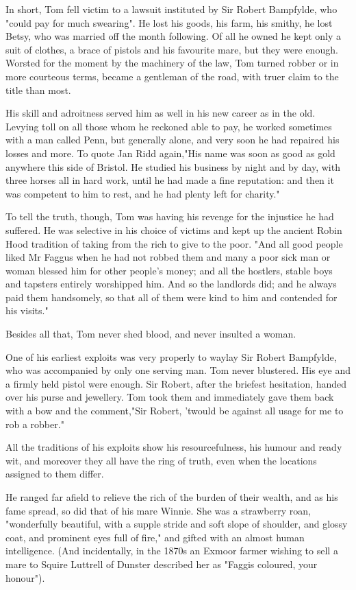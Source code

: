 In short, Tom fell victim to a lawsuit instituted by Sir Robert Bampfylde, who "could pay for much swearing". He lost his goods, his farm, his smithy, he lost Betsy, who was married off the month following. Of all he owned he kept only a suit of clothes, a brace of pistols and his favourite mare, but they were enough. Worsted for the moment by the machinery of the law, Tom turned robber   or in more courteous terms, became a gentleman of the road, with truer claim to the title than most.

His skill and adroitness served him as well in his new career as in the old. Levying toll on all those whom he reckoned able to pay, he worked sometimes with a man called Penn, but generally alone, and very soon he had repaired his losses and more. To quote Jan Ridd again,"His name was soon as good as gold anywhere this side of Bristol. He studied his business by night and by day, with three horses all in hard work, until he had made a fine reputation: and then it was competent to him to rest, and he had plenty left for charity."

To tell the truth, though, Tom was having his revenge for the injustice he had suffered. He was selective in his choice of victims and kept up the ancient Robin Hood tradition of taking from the rich to give to the poor. "And all good people liked Mr Faggus   when he had not robbed them   and many a poor sick man or woman blessed him for other people's money; and all the hostlers, stable boys and tapsters entirely worshipped him. And so the landlords did; and he always paid them handsomely, so that all of them were kind to him and contended for his visits."

Besides all that, Tom never shed blood, and never insulted a woman.

One of his earliest exploits was very properly to waylay Sir Robert Bampfylde, who was accompanied by only one serving man. Tom never blustered. His eye and a firmly held pistol were enough. Sir Robert, after the briefest hesitation, handed over his purse and jewellery. Tom took them and immediately gave them back with a bow and the comment,"Sir Robert, 'twould be against all usage for me to rob a robber."

All the traditions of his exploits show his resourcefulness, his humour and ready wit, and moreover they all have the ring of truth, even when the locations assigned to them differ.

 He ranged far afield to relieve the rich of the burden of their wealth, and as his fame spread, so did that of his mare Winnie. She was a strawberry roan, "wonderfully beautiful, with a supple stride and soft slope of shoulder, and glossy coat, and prominent eyes full of fire," and gifted with an almost human intelligence. (And incidentally, in the 1870s an Exmoor farmer wishing to sell a mare to Squire Luttrell of Dunster described her as "Faggis coloured, your honour").

